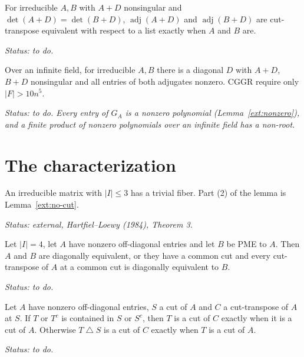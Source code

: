 \begin{lemma}
\label{lem:cggr215}
\leanok
{}
For irreducible $A,B$ with $A+D$ nonsingular and $\det(A+D)=\det(B+D)$,
$\operatorname{adj}(A+D)$ and
$\operatorname{adj}(B+D)$ are cut-transpose equivalent with respect to a list exactly when
$A$ and $B$ are.
\end{lemma}
\noindent\emph{Status: to do.}

\begin{lemma}
\label{lem:claim41}
\leanok
{}
Over an infinite field, for irreducible $A,B$ there is a diagonal $D$ with $A+D$, $B+D$
nonsingular and all entries of both adjugates nonzero. CGGR require only $|F|>10n^5$.
\end{lemma}
\noindent\emph{Status: to do. Every entry of $G_A$ is a nonzero polynomial
(Lemma~\ref{ext:nonzero}), and a finite product of nonzero polynomials over an infinite
field has a non-root.}

\section{The characterization}

\begin{lemma}
\label{ext:hl-small}
\leanok
{}
An irreducible matrix with $|I|\le3$ has a trivial fiber. Part (2) of the lemma is
Lemma~\ref{ext:no-cut}.
\end{lemma}
\noindent\emph{Status: external, Hartfiel--Loewy (1984), Theorem 3.}

\begin{lemma}[The case $|I|=4$ (CGGR Lemma 3.1)]
\label{lem:cggr31}
\leanok
{}
Let $|I|=4$, let $A$ have nonzero off-diagonal entries and let $B$ be PME to $A$. Then
$A$ and $B$ are diagonally equivalent, or they have a common cut and every cut-transpose
of $A$ at a common cut is diagonally equivalent to $B$.
\end{lemma}
\noindent\emph{Status: to do.}

\begin{lemma}
\label{lem:cggr32}
\leanok
{}
Let $A$ have nonzero off-diagonal entries, $S$ a cut of $A$ and $C$ a cut-transpose of $A$
at $S$. If $T$ or $T^c$ is contained in $S$ or $S^c$, then $T$ is a cut of $C$ exactly when
it is a cut of $A$. Otherwise $T\mathbin{\triangle}S$ is a cut of $C$ exactly when $T$ is a
cut of $A$.
\end{lemma}
\noindent\emph{Status: to do.}

